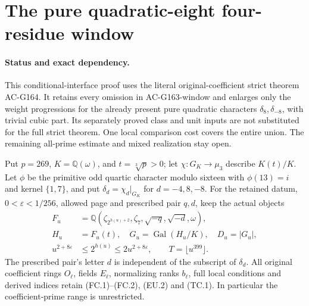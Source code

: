 \section{The pure quadratic-eight four-residue window}
\label{sec:pure-quadratic8-quarter-actual-window}

\paragraph{Status and exact dependency.}
This conditional-interface proof uses the literal original-coefficient
strict theorem AC-G164.  It retains every omission in AC-G163-window
and enlarges only the weight progressions for the already present
pure quadratic characters $\delta_8,\delta_{-8}$, with trivial cubic part.
Its separately proved class and unit inputs are not substituted for
the full strict theorem.  One local comparison cost covers the entire union.
The remaining all-prime estimate and mixed realization stay open.

Put $p=269$, $K=\mathbb Q(\omega)$, and $t=\sqrt[3]p>0$;
let $\chi:G_K\to\mu_3$ describe $K(t)/K$.
Let $\phi$ be the primitive odd quartic character modulo sixteen
with $\phi(13)=i$ and kernel $\{1,7\}$, and put
$\delta_d=\chi_d|_{G_K}$ for $d=-4,8,-8$.
For the retained datum, $0<\varepsilon<1/256$, allowed page and
prescribed pair $q,d$, keep the actual objects
\[
 \begin{aligned}
 F_u&=\mathbb Q(\zeta_{2^{h(u)+2}},\zeta_7,
                           \sqrt{-q},\sqrt{-d},\omega),\\
 H_u&=F_u(t),\quad G_u=\operatorname{Gal}(H_u/K),\quad D_u=|G_u|,\\
 u^{2+8\varepsilon}&\leq2^{h(u)}\leq2u^{2+8\varepsilon},
                         \qquad T=\lfloor u^{399}\rfloor .
 \end{aligned}
 \tag{P8QW.1}
\]
The prescribed pair's letter $d$ is independent of the subscript
of $\delta_d$.
All original coefficient rings $O_\ell$, fields $E_\ell$,
normalizing ranks $b_\ell$, full local conditions and derived
indices retain (FC.1)--(FC.2), (EU.2) and (TC.1).
In particular the coefficient-prime range is unrestricted.

